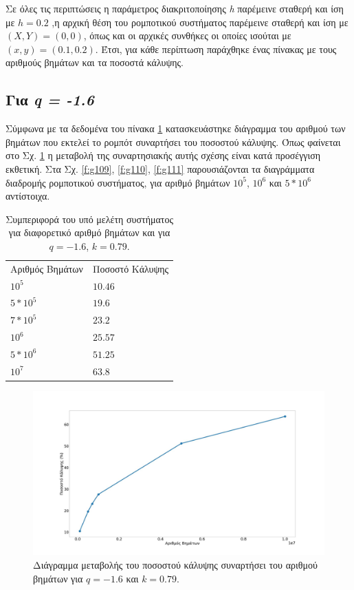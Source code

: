 Σε όλες τις περιπτώσεις η παράμετρος διακριτοποίησης \emph{h} παρέμεινε σταθερή και ίση με $h = 0.2$ ,η αρχική θέση του ρομποτικού συστήματος παρέμεινε σταθερή και ίση με $(X,Y) = (0,0)$, όπως και οι αρχικές συνθήκες οι οποίες ισούται με $(x,y) = (0.1,0.2)$.  Έτσι, για κάθε περίπτωση παράχθηκε ένας πίνακας με τους αριθμούς βημάτων και τα ποσοστά κάλυψης.

\subsection{Για \emph{q = -1.6}}

Σύμφωνα με τα δεδομένα του πίνακα \ref{tab:abc14} κατασκευάστηκε διάγραμμα του αριθμού των βημάτων που εκτελεί το ρομπότ συναρτήσει του ποσοστού κάλυψης. Όπως φαίνεται στο Σχ. \ref{f:g108} η μεταβολή της συναρτησιακής αυτής σχέσης είναι κατά προσέγγιση εκθετική. Στα Σχ. \ref{f:g109}, \ref{f:g110}, \ref{f:g111} παρουσιάζονται τα διαγράμματα διαδρομής ρομποτικού συστήματος, για αριθμό βημάτων $10^5$, $10^6$ και $5*10^6$ αντίστοιχα.

\begin{table}[ht]
	\centering
	\caption{Συμπεριφορά του υπό μελέτη συστήματος για διαφορετικό αριθμό βημάτων και για $q = -1.6$, $k = 0.79$.}
	\begin{tabular}{l | l }
		Αριθμός Βημάτων & Ποσοστό Κάλυψης \\

		$10^5$ &  $10.46$ \\
		$5*10^5$ & $19.6$ \\
		$7*10^5$&  $23.2$ \\
		$10^6$ & $25.57$ \\
		$5*10^6$& $51.25$\\
		$10^7$& $63.8$ \\
	
	\end{tabular}	
	\label{tab:abc14}
\end{table}




\begin{figure}[ht]
	\centering
	\includegraphics[width=1\linewidth]{LateX images/log/steps/g1}
	\caption{Διάγραμμα μεταβολής του ποσοστού κάλυψης συναρτήσει του αριθμού βημάτων για $q = -1.6$ και $k= 0.79$.}
	\label{f:g108}	
\end{figure}

